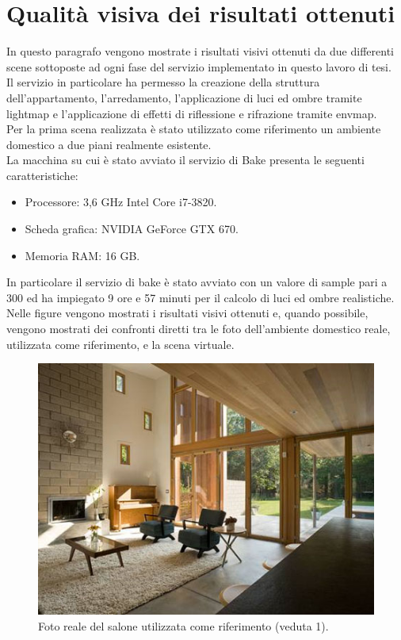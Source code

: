 \section{Qualità visiva dei risultati ottenuti}
\label{sec:chapter_prove_sperimentali_qualita_visiva}

In questo paragrafo vengono mostrate i risultati visivi ottenuti da due differenti scene sottoposte ad ogni fase del servizio implementato in questo lavoro di tesi.
\\ 
Il servizio in particolare ha permesso la creazione della struttura dell’appartamento, l’arredamento, l’applicazione di luci ed ombre tramite lightmap e l’applicazione di effetti di riflessione e rifrazione tramite envmap.
\\
Per la prima scena realizzata è stato utilizzato come riferimento un ambiente domestico a due piani realmente esistente.
\\
La macchina su cui è stato avviato il servizio di Bake presenta le seguenti caratteristiche:
\begin{itemize}
\item Processore: 3,6 GHz Intel Core i7-3820.
\item Scheda grafica: NVIDIA GeForce GTX 670.
\item Memoria RAM: 16 GB.
\end{itemize}
In particolare il servizio di bake  è stato avviato con un valore di sample pari a 300 ed ha impiegato 9 ore e 57 minuti per il calcolo di luci ed ombre realistiche.
\\
Nelle figure vengono mostrati i risultati visivi ottenuti e, quando possibile, vengono mostrati dei confronti diretti tra le foto dell'ambiente domestico reale, utilizzata come riferimento, e la scena virtuale.
\begin{figure}[htb]
 \centering
 \includegraphics[width=0.9\linewidth]{images/chapter_prove_sperimentali/scena1_reale.jpg}\hfill
 \caption[Ambiente reale: Salone, veduta 1]{Foto reale del salone utilizzata come riferimento (veduta 1).}
 \label{fig:prove_sperimentali_qualita_visiva_scena1_reale}
\end{figure}
